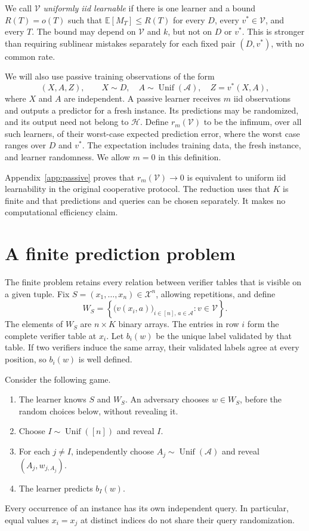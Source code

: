 \documentclass[11pt]{article}
\newcommand{\X}{\mathcal X}
\newcommand{\V}{\mathcal V}
\newcommand{\Hclass}{\mathcal H}
\newcommand{\A}{\mathcal A}
\newcommand{\E}{\mathbb E}
\DeclareMathOperator{\Unif}{Unif}
\begin{document}
We call $\V$ \emph{uniformly iid learnable} if there is one learner and a
bound $R(T)=o(T)$ such that $\E[M_T]\le R(T)$ for every $D$, every
$v^*\in\V$, and every $T$. The bound may depend on $\V$ and $k$, but not
on $D$ or $v^*$. This is stronger than requiring sublinear mistakes separately
for each fixed pair $(D,v^*)$, with no common rate.

We will also use passive training observations of the form
\[
(X,A,Z),\qquad X\sim D,\quad A\sim\Unif(\A),\quad Z=v^*(X,A),
\]
where $X$ and $A$ are independent. A passive learner receives $m$ iid
observations and outputs a predictor for a fresh instance. Its predictions
may be randomized, and its output need not belong to $\Hclass$. Define
$r_m(\V)$ to be the infimum, over all such learners, of their worst-case
expected prediction error, where the worst case ranges over $D$ and $v^*$.
The expectation includes training data, the fresh instance, and learner
randomness. We allow $m=0$ in this definition.

Appendix~\ref{app:passive} proves that $r_m(\V)\to0$ is equivalent to
uniform iid learnability in the original cooperative protocol. The reduction
uses that $K$ is finite and that predictions and queries can be chosen
separately. It makes no computational efficiency claim.

\section{A finite prediction problem}\label{sec:finite}

The finite problem retains every relation between verifier tables that is
visible on a given tuple. Fix $S=(x_1,\ldots,x_n)\in\X^n$, allowing
repetitions, and define
\[
W_S=\left\{
  \bigl(v(x_i,a)\bigr)_{i\in[n],\,a\in\A}:v\in\V
\right\}.
\]
The elements of $W_S$ are $n\times K$ binary arrays. The entries in row $i$
form the complete verifier table at $x_i$. Let $b_i(w)$ be the unique label
validated by that table. If two verifiers induce the same array, their
validated labels agree at every position, so $b_i(w)$ is well defined.

Consider the following game.
\begin{enumerate}
\item The learner knows $S$ and $W_S$. An adversary chooses $w\in W_S$,
before the random choices below, without revealing it.
\item Choose $I\sim\Unif([n])$ and reveal $I$.
\item For each $j\ne I$, independently choose $A_j\sim\Unif(\A)$ and
reveal $(A_j,w_{j,A_j})$.
\item The learner predicts $b_I(w)$.
\end{enumerate}
Every occurrence of an instance has its own independent query. In
particular, equal values $x_i=x_j$ at distinct indices do not share their
query randomization.
\end{document}
